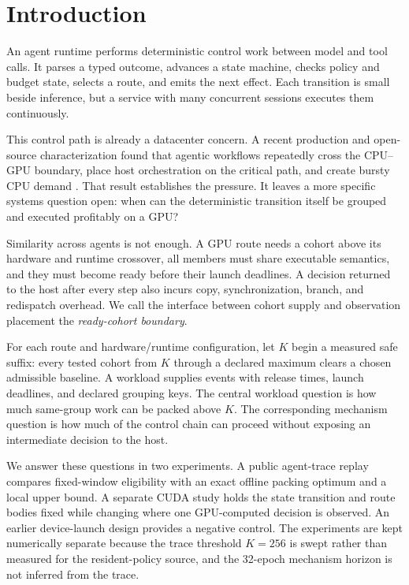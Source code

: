 \section{Introduction}
\label{sec:introduction}

An agent runtime performs deterministic control work between model and tool
calls. It parses a typed outcome, advances a state machine, checks policy and
budget state, selects a route, and emits the next effect. Each transition is
small beside inference, but a service with many concurrent sessions executes
them continuously.

This control path is already a datacenter concern. A recent production and
open-source characterization found that agentic workflows repeatedly cross the
CPU--GPU boundary, place host orchestration on the critical path, and create
bursty CPU demand \cite{yang2026agenticarchitecture}. That result establishes
the pressure. It leaves a more specific systems question open: when can the
deterministic transition itself be grouped and executed profitably on a GPU?

Similarity across agents is not enough. A GPU route needs a cohort above its
hardware and runtime crossover, all members must share executable semantics,
and they must become ready before their launch deadlines. A decision returned
to the host after every step also incurs copy, synchronization, branch, and
redispatch overhead. We call the interface between cohort supply and
observation placement the \emph{ready-cohort boundary}.

For each route and hardware/runtime configuration, let $K$ begin a measured
safe suffix: every tested cohort from $K$ through a declared maximum clears a
chosen admissible baseline. A workload supplies events with release times,
launch deadlines, and declared grouping keys. The central workload question is
how much same-group work can be packed above $K$. The corresponding mechanism
question is how much of the control chain can proceed without exposing an
intermediate decision to the host.

We answer these questions in two experiments. A public agent-trace replay
compares fixed-window eligibility with an exact offline packing optimum and a
local upper bound. A separate CUDA study holds the state transition and route
bodies fixed while changing where one GPU-computed decision is observed. An
earlier device-launch design provides a negative control. The experiments are
kept numerically separate because the trace threshold $K=256$ is swept rather
than measured for the resident-policy source, and the 32-epoch mechanism
horizon is not inferred from the trace.

